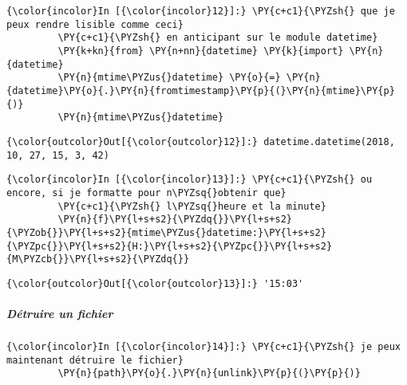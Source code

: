     \begin{Verbatim}[commandchars=\\\{\},frame=single,framerule=0.3mm,rulecolor=\color{cellframecolor}]
{\color{incolor}In [{\color{incolor}12}]:} \PY{c+c1}{\PYZsh{} que je peux rendre lisible comme ceci}
         \PY{c+c1}{\PYZsh{} en anticipant sur le module datetime}
         \PY{k+kn}{from} \PY{n+nn}{datetime} \PY{k}{import} \PY{n}{datetime}
         \PY{n}{mtime\PYZus{}datetime} \PY{o}{=} \PY{n}{datetime}\PY{o}{.}\PY{n}{fromtimestamp}\PY{p}{(}\PY{n}{mtime}\PY{p}{)}
         \PY{n}{mtime\PYZus{}datetime}
\end{Verbatim}


\begin{Verbatim}[commandchars=\\\{\},frame=single,framerule=0.3mm,rulecolor=\color{cellframecolor}]
{\color{outcolor}Out[{\color{outcolor}12}]:} datetime.datetime(2018, 10, 27, 15, 3, 42)
\end{Verbatim}
            
    \begin{Verbatim}[commandchars=\\\{\},frame=single,framerule=0.3mm,rulecolor=\color{cellframecolor}]
{\color{incolor}In [{\color{incolor}13}]:} \PY{c+c1}{\PYZsh{} ou encore, si je formatte pour n\PYZsq{}obtenir que}
         \PY{c+c1}{\PYZsh{} l\PYZsq{}heure et la minute}
         \PY{n}{f}\PY{l+s+s2}{\PYZdq{}}\PY{l+s+s2}{\PYZob{}}\PY{l+s+s2}{mtime\PYZus{}datetime:}\PY{l+s+s2}{\PYZpc{}}\PY{l+s+s2}{H:}\PY{l+s+s2}{\PYZpc{}}\PY{l+s+s2}{M\PYZcb{}}\PY{l+s+s2}{\PYZdq{}}
\end{Verbatim}


\begin{Verbatim}[commandchars=\\\{\},frame=single,framerule=0.3mm,rulecolor=\color{cellframecolor}]
{\color{outcolor}Out[{\color{outcolor}13}]:} '15:03'
\end{Verbatim}
            
    \hypertarget{duxe9truire-un-fichier}{%
\subparagraph{Détruire un fichier}\label{duxe9truire-un-fichier}}

    \begin{Verbatim}[commandchars=\\\{\},frame=single,framerule=0.3mm,rulecolor=\color{cellframecolor}]
{\color{incolor}In [{\color{incolor}14}]:} \PY{c+c1}{\PYZsh{} je peux maintenant détruire le fichier}
         \PY{n}{path}\PY{o}{.}\PY{n}{unlink}\PY{p}{(}\PY{p}{)}
\end{Verbatim}


